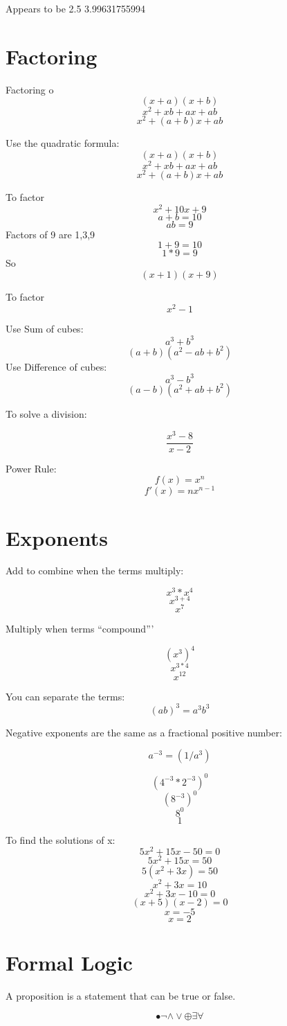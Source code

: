 \documentclass{article}
\begin{document}
Appears to be 2.5
3.99631755994

\section{Factoring}

Factoring o
$$(x+a)(x+b)$$
$$x^2+xb+ax+ab$$
$$x^2+(a+b)x+ab$$

Use the quadratic formula:
$$(x+a)(x+b)$$
$$x^2+xb+ax+ab$$
$$x^2+(a+b)x+ab$$

To factor $$x^2+10x+9$$
$$a+b = 10$$
$$ab = 9$$
Factors of 9 are 1,3,9
$$1+9 = 10$$
$$1*9 = 9$$
So
$$(x+1)(x+9)$$

To factor $$x^2-1$$

Use Sum of cubes:
$$a^3+b^3$$
$$(a+b)(a^2-ab+b^2)$$
Use Difference of cubes:
$$a^3-b^3$$
$$(a-b)(a^2+ab+b^2)$$

To solve a division:

$$\frac{x^3-8}{x-2}$$

Power Rule:
$$f(x)=x^n$$
$$f'(x)=nx^{n-1}$$


\section{Exponents}

Add to combine when the terms multiply:

$$x^3*x^4$$
$$x^{3+4}$$
$$x^7$$

Multiply when terms ``compound'''

$$(x^3)^4$$
$$x^{3*4}$$
$$x^{12}$$


You can separate the terms:
$$(ab)^3 = a^3b^3$$

Negative exponents are the same as a fractional positive number:

$$a^{-3} = (1/a^3)$$


$$(4^{-3}*2^{-3})^0$$
$$(8^{-3})^0$$
$$8^{0}$$
$$1$$

To find the solutions of x:
$$5x^2+15x-50=0$$
$$5x^2+15x=50$$
$$5(x^2+3x)=50$$
$$x^2+3x=10$$
$$x^2+3x-10=0$$
$$(x+5)(x-2)=0$$
$$x=-5$$
$$x=2$$

\section{Formal Logic}

A proposition is a statement that can be true or false.

\begin{equation}
	\bullet	
  \neg	
	\wedge	
	\vee	
	\oplus	
	\exists	
	\forall	
\end{equation}
\end{document}
